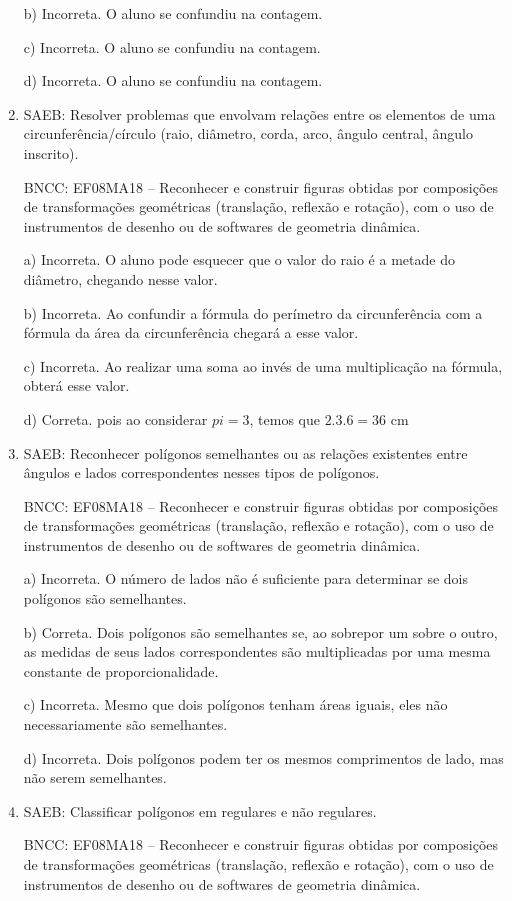 \begin{enumerate}
b) Incorreta. O aluno se confundiu na contagem.

c) Incorreta. O aluno se confundiu na contagem.

d) Incorreta. O aluno se confundiu na contagem.

\item SAEB: Resolver problemas que envolvam relações entre os elementos de uma
circunferência/círculo (raio, diâmetro, corda, arco, ângulo central,
ângulo inscrito).

BNCC: EF08MA18 -- Reconhecer e construir figuras obtidas por composições
de transformações geométricas (translação, reflexão e rotação), com o
uso de instrumentos de desenho ou de softwares de geometria dinâmica.

a) Incorreta. O aluno pode esquecer que o valor do raio é a metade
do diâmetro, chegando nesse valor.

b) Incorreta. Ao confundir a fórmula do perímetro da circunferência
com a fórmula da área da circunferência chegará a esse valor.

c) Incorreta. Ao realizar uma soma ao invés de uma multiplicação
na fórmula, obterá esse valor.

d) Correta. pois ao considerar $pi = 3$, temos que $2.3.6 = 36$ cm

\item SAEB: Reconhecer polígonos semelhantes ou as relações existentes entre
ângulos e lados correspondentes nesses tipos de polígonos.

BNCC: EF08MA18 -- Reconhecer e construir figuras obtidas por composições
de transformações geométricas (translação, reflexão e rotação), com o
uso de instrumentos de desenho ou de softwares de geometria dinâmica.

a) Incorreta. O número de lados não é suficiente para determinar se
dois polígonos são semelhantes.

b) Correta. Dois polígonos são semelhantes se, ao sobrepor um sobre
o outro, as medidas de seus lados correspondentes são multiplicadas por
uma mesma constante de proporcionalidade.

c) Incorreta. Mesmo que dois polígonos tenham áreas iguais, eles
não necessariamente são semelhantes.

d) Incorreta. Dois polígonos podem ter os mesmos comprimentos de
lado, mas não serem semelhantes.

\item SAEB: Classificar polígonos em regulares e não regulares.

BNCC: EF08MA18 -- Reconhecer e construir figuras obtidas por composições
de transformações geométricas (translação, reflexão e rotação), com o
uso de instrumentos de desenho ou de softwares de geometria dinâmica.


\end{enumerate}
